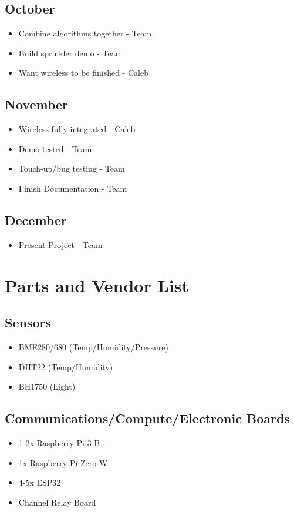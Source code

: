 \documentclass[letterpaper, 10 pt, conference]{ieeeconf}  %
\begin{document}
\subsection{October}
\begin{itemize}
    \item Combine algorithms together - Team
    \item Build sprinkler demo - Team
    \item Want wireless to be finished - Caleb
\end{itemize}

\subsection{November}
\begin{itemize}
    \item Wireless fully integrated - Caleb
    \item Demo tested - Team
    \item Touch-up/bug testing - Team
    \item Finish Documentation - Team
\end{itemize}

\subsection{December}
\begin{itemize}
    \item Present Project - Team
\end{itemize}



\section{Parts and Vendor List}
\subsection{Sensors}
\begin{itemize}
  \item BME280/680 (Temp/Humidity/Pressure)
  \item DHT22 (Temp/Humidity)
  \item BH1750 (Light)
\end{itemize}

\subsection{Communications/Compute/Electronic Boards}
\begin{itemize}
  \item 1-2x Raspberry Pi 3 B+
  \item 1x Raspberry Pi Zero W
  \item 4-5x ESP32
  \item Channel Relay Board
\end{itemize}
\end{document}

